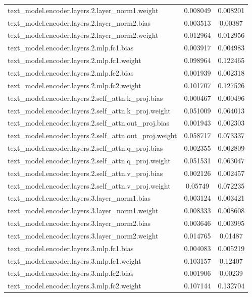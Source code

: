\begin{longtable}{lcc}
text\_model.encoder.layers.2.layer\_norm1.weight & 0.008049 & 0.008201 \\
text\_model.encoder.layers.2.layer\_norm2.bias & 0.003513 & 0.00387 \\
text\_model.encoder.layers.2.layer\_norm2.weight & 0.012964 & 0.012956 \\
text\_model.encoder.layers.2.mlp.fc1.bias & 0.003917 & 0.004983 \\
text\_model.encoder.layers.2.mlp.fc1.weight & 0.098964 & 0.122465 \\
text\_model.encoder.layers.2.mlp.fc2.bias & 0.001939 & 0.002318 \\
text\_model.encoder.layers.2.mlp.fc2.weight & 0.101707 & 0.127526 \\
text\_model.encoder.layers.2.self\_attn.k\_proj.bias & 0.000467 & 0.000496 \\
text\_model.encoder.layers.2.self\_attn.k\_proj.weight & 0.051009 & 0.064013 \\
text\_model.encoder.layers.2.self\_attn.out\_proj.bias & 0.001943 & 0.002303 \\
text\_model.encoder.layers.2.self\_attn.out\_proj.weight & 0.058717 & 0.073337 \\
text\_model.encoder.layers.2.self\_attn.q\_proj.bias & 0.002355 & 0.002809 \\
text\_model.encoder.layers.2.self\_attn.q\_proj.weight & 0.051531 & 0.063047 \\
text\_model.encoder.layers.2.self\_attn.v\_proj.bias & 0.002126 & 0.002457 \\
text\_model.encoder.layers.2.self\_attn.v\_proj.weight & 0.05749 & 0.072235 \\
text\_model.encoder.layers.3.layer\_norm1.bias & 0.003124 & 0.003421 \\
text\_model.encoder.layers.3.layer\_norm1.weight & 0.008333 & 0.008608 \\
text\_model.encoder.layers.3.layer\_norm2.bias & 0.003646 & 0.003995 \\
text\_model.encoder.layers.3.layer\_norm2.weight & 0.014765 & 0.01487 \\
text\_model.encoder.layers.3.mlp.fc1.bias & 0.004083 & 0.005219 \\
text\_model.encoder.layers.3.mlp.fc1.weight & 0.103157 & 0.12407 \\
text\_model.encoder.layers.3.mlp.fc2.bias & 0.001906 & 0.00239 \\
text\_model.encoder.layers.3.mlp.fc2.weight & 0.107144 & 0.132704 \\

\end{longtable}
